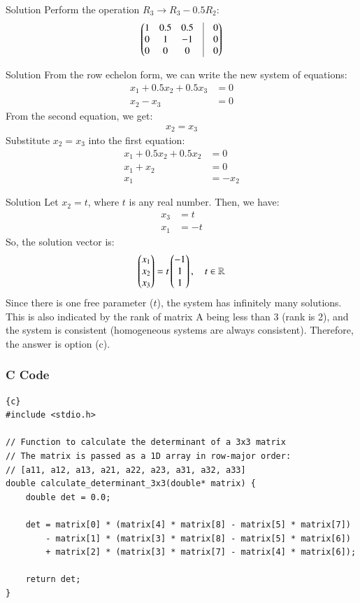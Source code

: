 \documentclass{beamer}
\begin{document}
\begin{frame}{Solution}
Perform the operation $R_3 \rightarrow R_3 - 0.5 R_2$:
\begin{align}
\myvec{
1 & 0.5 & 0.5 & \vrule & 0 \\
0 & 1 & -1 & \vrule & 0 \\
0 & 0 & 0 & \vrule & 0
}
\end{align}
\end{frame}

\begin{frame}{Solution}
From the row echelon form, we can write the new system of equations:
\begin{align}
x_1 + 0.5x_2 + 0.5x_3 &= 0 \\
x_2 - x_3 &= 0
\end{align}
From the second equation, we get:
\begin{align}
x_2 = x_3
\end{align}
Substitute $x_2 = x_3$ into the first equation:
\begin{align}
x_1 + 0.5x_2 + 0.5x_2 &= 0 \\
x_1 + x_2 &= 0 \\
x_1 &= -x_2
\end{align}
\end{frame}

\begin{frame}{Solution}
Let $x_2 = t$, where $t$ is any real number.
Then, we have:
\begin{align}
x_3 &= t \\
x_1 &= -t
\end{align}
So, the solution vector is:
\begin{align}
\begin{pmatrix}x_1 \\ x_2 \\ x_3\end{pmatrix} = t \begin{pmatrix}-1 \\ 1 \\ 1\end{pmatrix}, \quad t \in \mathbb{R}
\end{align}
Since there is one free parameter ($t$), the system has infinitely many solutions. This is also indicated by the rank of matrix A being less than 3 (rank is 2), and the system is consistent (homogeneous systems are always consistent).
Therefore, the answer is option (c).
\end{frame}

\begin{frame}[fragile]
\frametitle{C Code}
\begin{lstlisting}{c}
#include <stdio.h>

// Function to calculate the determinant of a 3x3 matrix
// The matrix is passed as a 1D array in row-major order:
// [a11, a12, a13, a21, a22, a23, a31, a32, a33]
double calculate_determinant_3x3(double* matrix) {
    double det = 0.0;
    
    det = matrix[0] * (matrix[4] * matrix[8] - matrix[5] * matrix[7])
        - matrix[1] * (matrix[3] * matrix[8] - matrix[5] * matrix[6])
        + matrix[2] * (matrix[3] * matrix[7] - matrix[4] * matrix[6]);

    return det;
}
\end{lstlisting}
\end{frame}
\end{document}
